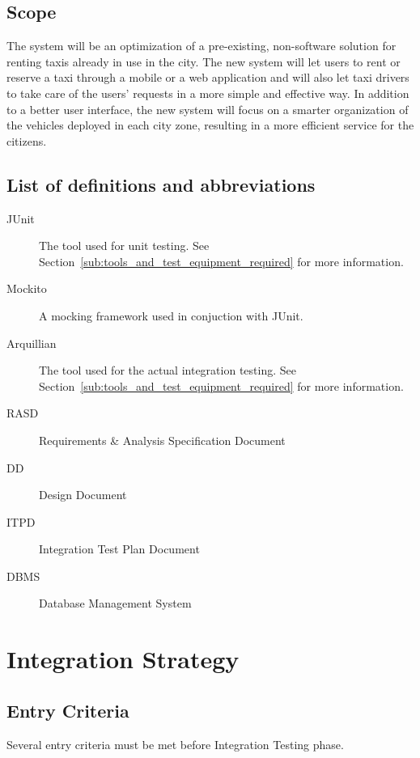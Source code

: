 \documentclass[a4paper, 12pt]{article}
\begin{document}
\subsection{Scope} %
\label{sub:scope}
The system will be an optimization of a pre-existing, non-software solution for renting taxis already in use in the city. The new system will let users to rent or reserve a taxi through a mobile or a web application and will also let taxi drivers to take care of the users' requests in a more simple and effective way. In addition to a better user interface, the new system will focus on a smarter organization of the vehicles deployed in each city zone, resulting in a more efficient service for the citizens.


\newpage
\subsection{List of definitions and abbreviations}
\label{sub:list_of_definitions_and_abbreviations}

\begin{description}
    \item[JUnit] The tool used for unit testing. See Section~\ref{sub:tools_and_test_equipment_required} for more information.
    \item[Mockito] A mocking framework used in conjuction with JUnit.
    \item[Arquillian] The tool used for the actual integration testing. See Section~\ref{sub:tools_and_test_equipment_required} for more information.
    \item[RASD] Requirements \& Analysis Specification Document
    \item[DD] Design Document
    \item[ITPD] Integration Test Plan Document
    \item[DBMS] Database Management System
\end{description}

\newpage
\section{Integration Strategy}
\label{sec:integration_strategy}

\subsection{Entry Criteria}
\label{sub:entry_criteria}
Several entry criteria must be met before Integration Testing phase.
\end{document}
